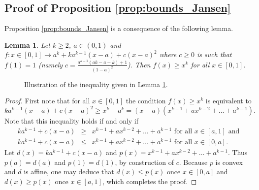 \documentclass{article}
\theoremstyle{plain}
\newtheorem{lemma}[theorem]{Lemma}
\begin{document}
\subsection{Proof of Proposition \ref{prop:bounds_Jansen}}

Proposition \ref{prop:bounds_Jansen} is a consequence of the following lemma.

\begin{lemma}\label{lem:c}
Let $k\ge 2$, $a\in (0,1)$ and $f\colon x\in [0,1]\to a^k+ka^{k-1}(x-a)+c(x-a)^2$
where $c\ge 0$ is such that $f(1)=1$ (namely $c = \frac{a^{k-1}(ak - a - k)+1}{(1-a)^2}$). Then $f(x)\ge x^k$ for all $x\in[0,1]$.
\end{lemma}


\begin{figure}
\centering
{}
\caption{Illustration of the inequality given in Lemma \ref{lem:c}.}
\label{fig:illustration_ineq}
\end{figure}
\begin{proof}
First note that for all $x\in[0,1]$ the condition $f(x)\ge x^k$ is equivalent to 
\[
ka^{k-1}(x-a)+c(x-a)^2 \ge x^k-a^k = (x-a)(x^{k-1}+ax^{k-2}+\dots+a^{k-1}).
\]
Note that this inequality holds if and only if 
\begin{eqnarray*}
ka^{k-1}+c(x-a)&\ge& x^{k-1}+ax^{k-2}+\dots+a^{k-1}\text{ for all }x\in [a,1] \text{ and}\\
ka^{k-1}+c(x-a)&\le& x^{k-1}+ax^{k-2}+\dots+a^{k-1}\text{ for all } x\in [0,a].
\end{eqnarray*}
Let $d(x)=ka^{k-1}+c(x-a)$ and $p(x)=x^{k-1}+ax^{k-2}+\dots+a^{k-1}$. Thus $p(a)=d(a)$ and $p(1)=d(1)$, by construction of $c$. Because $p$ is convex and $d$ is affine, one may deduce that $d(x)\le p(x)$ once $x\in [0,a]$ and $d(x)\ge p(x)$ once $x\in [a,1]$, which completes the proof. 
\end{proof}
\end{document}

